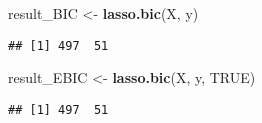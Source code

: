 \documentclass[
]{article}
\newenvironment{Shaded}{\begin{snugshade}}{\end{snugshade}}
\newcommand{\ConstantTok}[1]{\textcolor[rgb]{0.56,0.35,0.01}{#1}}
\newcommand{\FunctionTok}[1]{\textcolor[rgb]{0.13,0.29,0.53}{\textbf{#1}}}
\newcommand{\NormalTok}[1]{#1}
\newcommand{\OtherTok}[1]{\textcolor[rgb]{0.56,0.35,0.01}{#1}}
\newcommand{\SpecialCharTok}[1]{\textcolor[rgb]{0.81,0.36,0.00}{\textbf{#1}}}
\begin{document}
\begin{Shaded}
\begin{Highlighting}[]
\NormalTok{result\_BIC }\OtherTok{\textless{}{-}} \FunctionTok{lasso.bic}\NormalTok{(X, y)}
\end{Highlighting}
\end{Shaded}

\begin{verbatim}
## [1] 497  51
\end{verbatim}

\begin{Shaded}
\begin{Highlighting}[]
\NormalTok{result\_EBIC }\OtherTok{\textless{}{-}} \FunctionTok{lasso.bic}\NormalTok{(X, y, }\ConstantTok{TRUE}\NormalTok{)}
\end{Highlighting}
\end{Shaded}

\begin{verbatim}
## [1] 497  51
\end{verbatim}

\begin{Shaded}
\end{Shaded}
\end{document}
